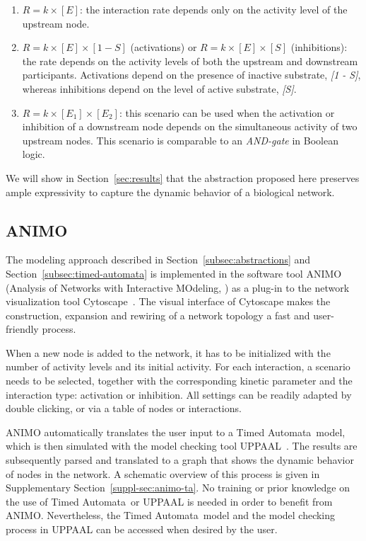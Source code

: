 \documentclass{bmcart}
\def\tas{Timed Automata}
\begin{document}
\begin{enumerate}
  \item $R = k \times [E]$: the interaction rate depends only on the activity level of the upstream node.
  \item $R = k \times [E] \times [1 - S]$ (activations) or $R = k \times [E] \times [S]$ (inhibitions): the rate
  depends on the activity levels of both the upstream and downstream participants. Activations depend on the
  presence of inactive substrate, \emph{[1 - S]}, whereas inhibitions depend on the level of active substrate,
  \emph{[S]}.
  \item $R = k \times [E_1] \times [E_2]$: this scenario can be used when the activation or inhibition
  of a downstream node depends on the simultaneous activity of two upstream nodes. This scenario is comparable to an
  \emph{AND-gate} in Boolean logic.
\end{enumerate}
We will show in Section~\ref{sec:results} that the abstraction proposed here preserves ample
expressivity to capture the dynamic behavior of a biological network.









\subsection{ANIMO}
The modeling approach described in Section~\ref{subsec:abstractions} and Section~\ref{subsec:timed-automata}
is implemented in the
software tool ANIMO (Analysis of Networks with Interactive MOdeling, \cite{animo-ieee}) as
a plug-in to the network visualization tool Cytoscape~\cite{cytoscape}. The visual interface of Cytoscape
makes the construction, expansion and rewiring of a network topology a fast and user-friendly process.

When a new node is added to the network, it has to be initialized with the number of activity levels and
its initial activity.
For each interaction, a scenario needs to be selected, together with the corresponding kinetic parameter and
the interaction type: activation or inhibition. All settings can be readily adapted by double clicking, or via a
table of nodes or interactions.

ANIMO automatically translates the user input to a \tas\ model, which is then simulated with the model
checking tool UPPAAL~\cite{uppaal}. The results are subsequently parsed and translated to a graph that shows
the dynamic behavior of nodes in the network.
A schematic overview of this process is given in Supplementary Section~\ref{suppl-sec:animo-ta}.
No training or prior knowledge on the use of \tas\ or UPPAAL is needed in order to benefit from ANIMO.
Nevertheless, the \tas\ model and the model checking process in UPPAAL can be accessed when desired by the user.
\end{document}
